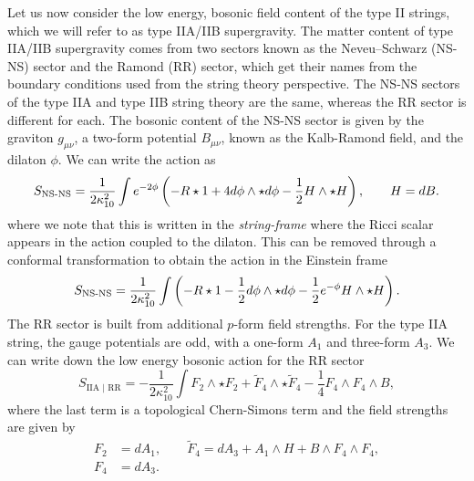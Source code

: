 Let us now consider the low energy, bosonic field content of the type II strings, which we will refer to as type IIA/IIB supergravity. The matter content of type IIA/IIB supergravity comes from two sectors known as the Neveu–Schwarz (NS-NS) sector and the Ramond (RR) sector, which get their names from the boundary conditions used from the string theory perspective. The NS-NS sectors of the type IIA and type IIB string theory are the same, whereas the RR sector is different for each. The bosonic content of the NS-NS sector is given by the graviton $g_{\mu \nu}$, a two-form potential $B_{\mu \nu}$, known as the Kalb-Ramond field, and the dilaton $\phi$. We can write the action as \cite{Witten:1995ex}
\begin{equation*}
	S_{\text{NS-NS}} = \frac{1}{2 \kappa_{10}^2} \int e^{-2\phi} \left( -R \star 1 + 4 d\phi \wedge \star d\phi - \frac{1}{2} H \wedge \star H \right), \qquad H = dB.
\end{equation*}
where we note that this is written in the \emph{string-frame} where the Ricci scalar appears in the action coupled to the dilaton. This can be removed through a conformal transformation to obtain the action in the Einstein frame \cite{Polchinski:1998rr}
\begin{equation*}
	S_{\text{NS-NS}} = \frac{1}{2 \kappa_{10}^2} \int \left( -R \star 1 - \frac{1}{2} d\phi \wedge \star d\phi - \frac{1}{2} e^{-\phi} H \wedge \star H \right).
\end{equation*}
The RR sector is built from additional $p$-form field strengths. For the type IIA string, the gauge potentials are odd, with a one-form $A_1$ and three-form $A_3$. We can write down the low energy bosonic action for the RR sector \cite{Witten:1995ex}
\begin{equation*}
	S_{\text{IIA | RR}} = - \frac{1}{2 \kappa_{10}^2} \int F_2 \wedge \star F_2 +  \tilde{F}_4 \wedge \star \tilde{F}_4 - \frac{1}{4} F_4 \wedge F_4 \wedge B,
\end{equation*}
where the last term is a topological Chern-Simons term and the field strengths are given by
\begin{equation*}
	\begin{aligned}
		F_2 &= dA_1, \qquad \tilde{F}_4 = dA_3 + A_1 \wedge H + B \wedge F_4 \wedge F_4, \\
		F_4 &= dA_3.
	\end{aligned}
\end{equation*}

